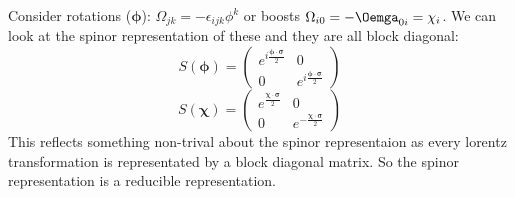 \documentclass[12pt, a4paper, twoside, titlepage]{article}
\begin{document}
Consider rotations ($\bm \phi$): $\Omega_{jk} = - \epsilon_{ijk} \phi^k$ or boosts $\Omega_{i0} = - \Oemga_{0i} = \chi_i$. We can look at the spinor representation of these and they are all block diagonal:
$$
                                        S(\bm \phi) = \begin{pmatrix} e^{i \frac{\bm \phi \cdot \bm \sigma}{2}} & 0 \\0&e^{i \frac{\bm \phi \cdot \bm \sigma}{2}} \end{pmatrix}
$$
$$
                                        S(\bm \chi) = \begin{pmatrix} e^{ \frac{\bm \chi \cdot \bm \sigma}{2}} & 0 \\0&e^{- \frac{\bm \chi \cdot \bm \sigma}{2}} \end{pmatrix}
$$
This reflects something non-trival about the spinor representaion as every lorentz transformation is representated by a block diagonal matrix. So the spinor representation is a reducible representation.
\end{document}
